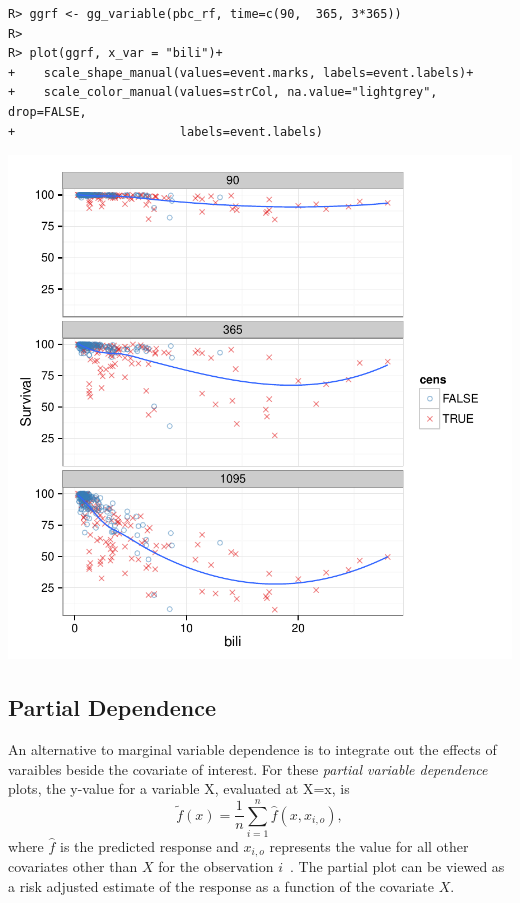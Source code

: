 \documentclass[nojss,letterpaper]{jss}\usepackage[]{graphicx}\usepackage[]{color}
\makeatletter
\def\maxwidth{ %
  \ifdim\Gin@nat@width>\linewidth
    \linewidth
  \else
    \Gin@nat@width
  \fi
}
\newenvironment{kframe}{%
 \def\at@end@of@kframe{}%
 \ifinner\ifhmode%
  \def\at@end@of@kframe{\end{minipage}}%
  \begin{minipage}{\columnwidth}%
 \fi\fi%
 \def\FrameCommand##1{\hskip\@totalleftmargin \hskip-\fboxsep
 \colorbox{shadecolor}{##1}\hskip-\fboxsep
     \hskip-\linewidth \hskip-\@totalleftmargin \hskip\columnwidth}%
 \MakeFramed {\advance\hsize-\width
   \@totalleftmargin\z@ \linewidth\hsize
   \@setminipage}}%
 {\par\unskip\endMakeFramed%
 \at@end@of@kframe}
\newenvironment{knitrout}{}{} %
\makeatother
\begin{document}
\begin{knitrout}\footnotesize
{}\color{fgcolor}\begin{kframe}
\begin{verbatim}
R> ggrf <- gg_variable(pbc_rf, time=c(90,  365, 3*365))
R> 
R> plot(ggrf, x_var = "bili")+
+    scale_shape_manual(values=event.marks, labels=event.labels)+
+    scale_color_manual(values=strCol, na.value="lightgrey", drop=FALSE,
+                       labels=event.labels)
\end{verbatim}
\end{kframe}

{\centering \includegraphics[width=\maxwidth]{figure/vig-variable-plot-stacks-1} 

}



\end{knitrout}

\subsection{Partial Dependence}\label{S:partialDependence}

An alternative to marginal variable dependence is to integrate out the effects of varaibles beside the covariate of interest. For these \emph{partial variable dependence} plots, the y-value for a variable X, evaluated at X=x, is
\[
\tilde{f}(x) = \frac{1}{n} \sum_{i=1}^n \hat{f}(x, x_{i,o}),
\]
where $\hat{f}$ is the predicted response and $x_{i,o}$ represents the value for all other covariates other than $X$ for the observation $i$~\citep{FriedmanGreedyfunction:2000}. The partial plot can be viewed as a risk adjusted estimate of the response as a function of the covariate $X$.
\end{document}
